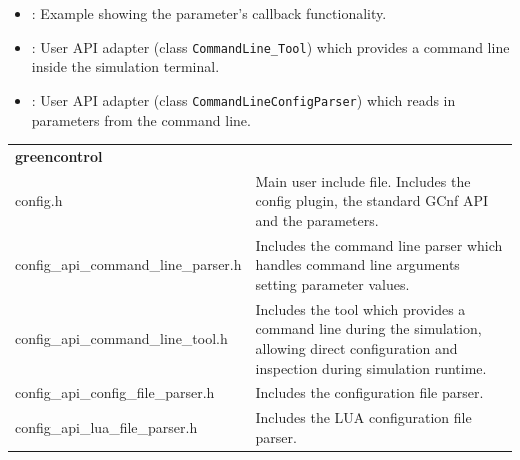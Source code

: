 \begin{itemize}
  \item {}:  \newline
  	Example showing the parameter's callback functionality.

  \item {}:  \newline
  	User API adapter (class \lstinline|CommandLine_Tool|) which provides a command line inside the simulation terminal.

  \item {}:  \newline
  	User API adapter (class \lstinline|CommandLineConfigParser|) which reads in parameters from the command line.
\end{itemize}


\noindent
\begin{minipage}{\textwidth}
\begin{tabularx}{\textwidth}{|l|X|}
	\cline{1-1}\cline{2-2}\multicolumn{2}{|l|}{  {\bf\sffamily greencontrol}    }\\
	\cline{1-1}\cline{2-2}  config.h &   Main user include file. Includes the config plugin, the standard GCnf API and the parameters.   \\
	\hline
	\cline{1-1}\cline{2-2}  config\_api\_command\_line\_parser.h &   Includes the command line parser which handles command line arguments setting parameter values.  \\
	\hline
	\cline{1-1}\cline{2-2}  config\_api\_command\_line\_tool.h &   Includes the tool which provides a command line during the simulation, allowing direct configuration and inspection during simulation runtime.  \\
	\hline
	\cline{1-1}\cline{2-2}  config\_api\_config\_file\_parser.h &   Includes the configuration file parser. \\
	\hline
	\cline{1-1}\cline{2-2}  config\_api\_lua\_file\_parser.h &   Includes the LUA configuration file parser. \\
	\hline
\end{tabularx}
\end{minipage}

\vspace{1 cm}

